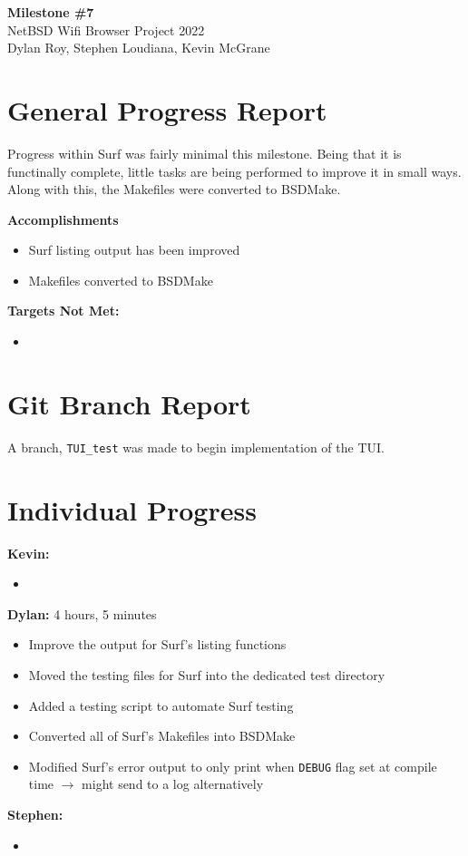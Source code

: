 \documentclass[11pt]{article}
\begin{document}
\begin{center}
  \textbf{\Large Milestone \#7}\\\large NetBSD Wifi Browser Project 2022\\
  Dylan Roy, Stephen Loudiana, Kevin McGrane
\end{center}


\section{General Progress Report}
Progress within Surf was fairly minimal this milestone. Being that it
is functinally complete, little tasks are being performed to improve
it in small ways. Along with this, the Makefiles were converted to BSDMake.

\textbf{Accomplishments}
\begin{itemize}
  \item Surf listing output has been improved
  \item Makefiles converted to BSDMake
\end{itemize}

\textbf{Targets Not Met:}
\begin{itemize}
  \item 
\end{itemize}


\section{Git Branch Report}
A branch, \texttt{TUI\_test} was made to begin implementation of the TUI.

\newpage
\section{Individual Progress}

\textbf{Kevin:}
\begin{itemize}
  \item
\end{itemize}

\textbf{Dylan:} 4 hours, 5 minutes
\begin{itemize}
  \item Improve the output for Surf's listing functions
  \item Moved the testing files for Surf into the dedicated test directory
  \item Added a testing script to automate Surf testing
  \item Converted all of Surf's Makefiles into BSDMake
  \item Modified Surf's error output to only print when \texttt{DEBUG} flag set
    at compile time $\rightarrow$ might send to a log alternatively
\end{itemize}

\textbf{Stephen:}
\begin{itemize}
  \item
\end{itemize}
\end{document}
